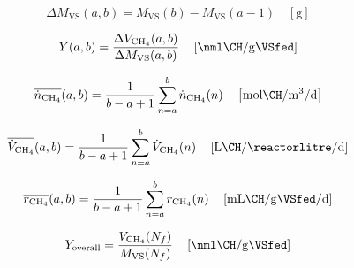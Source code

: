 \begin{equation}
    \Delta M_{\mathrm{VS}}(a,b) = M_{\mathrm{VS}}(b) - M_{\mathrm{VS}}(a-1) \quad \left[\unit{\gram}\right]
    \label{eq:deltaMVS}
\end{equation}

\begin{equation}
    Y(a,b) = \frac{\Delta V_{\mathrm{CH_4}}(a,b)}{\Delta M_{\mathrm{VS}}(a,b)} \quad \left[\unit{\nml\CH\per\gram\VSfed}\right]
    \label{eq:phaseYield}
\end{equation}

\begin{equation}
    \overline{\dot{n}_{\mathrm{CH_4}}}(a,b) = \frac{1}{b - a + 1} \sum_{n=a}^{b} \dot{n}_{\mathrm{CH_4}}(n) \quad \left[\unit{\mol\CH\per\cubic\metre\per\day}\right]
    \label{eq:avgMolRate}
\end{equation}

\begin{equation}
    \overline{\dot{V}_{\mathrm{CH_4}}}(a,b) = \frac{1}{b - a + 1} \sum_{n=a}^{b} \dot{V}_{\mathrm{CH_4}}(n) \quad \left[\unit{\litre\CH\per\reactorlitre\per\day}\right]
    \label{eq:avgVolRate}
\end{equation}

\begin{equation}
    \overline{r_{\mathrm{CH_4}}}(a,b) = \frac{1}{b - a + 1} \sum_{n=a}^{b} r_{\mathrm{CH_4}}(n) \quad \left[\unit{\milli\litre\CH\per\gram\VSfed\per\day}\right]
    \label{eq:avgDailyRate}
\end{equation}

\begin{equation}
    Y_{\text{overall}} = \frac{V_{\mathrm{CH_4}}(N_f)}{M_{\mathrm{VS}}(N_f)} \quad \left[\unit{\nml\CH\per\gram\VSfed}\right]
    \label{eq:overallYield}
\end{equation}
